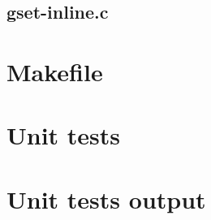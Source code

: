 \begin{scriptsize}
\begin{ttfamily}

\end{ttfamily}
\end{scriptsize}

\subsection{gset-inline.c}

\begin{scriptsize}
\begin{ttfamily}

\end{ttfamily}
\end{scriptsize}

\section{Makefile}

\begin{scriptsize}
\begin{ttfamily}

\end{ttfamily}
\end{scriptsize}

\section{Unit tests}

\begin{scriptsize}
\begin{ttfamily}

\end{ttfamily}
\end{scriptsize}

\section{Unit tests output}

\begin{scriptsize}
\begin{ttfamily}

\end{ttfamily}
\end{scriptsize}

